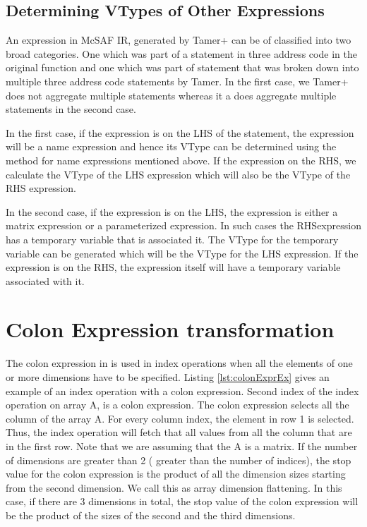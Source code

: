 \subsection{Determining VTypes of Other Expressions}
An expression in McSAF IR, generated by Tamer+ can be of classified into two broad categories. One which was part of a statement in three address code in the original \matlab function and one which was part of statement that was broken down into multiple three  address code statements by Tamer. In the first case, we Tamer+ does not aggregate multiple statements whereas it a does aggregate multiple statements in the second case.  

In the first case, if the expression is on the LHS of the statement, the expression will be a name expression and hence its VType can be determined using the method for name expressions mentioned above. If the expression on the RHS, we calculate the VType of the LHS expression which will also be the VType of the RHS expression. 

In the second case, if the expression is on the LHS, the expression is either a matrix expression or a parameterized expression. In such cases the RHSexpression has a temporary variable that is associated it. The VType for the temporary variable can be generated which will be the VType for the LHS expression. If the expression is on the RHS, the expression itself will have a temporary variable associated with it. 
\section{Colon Expression transformation}
\label{sec:colonExpr}
The colon expression in \matlab is used in index operations when all the elements of one or more dimensions have to be specified. Listing \ref{lst:colonExprEx} gives an example of an index operation with a colon expression. Second index of the index operation on array A, is a colon expression. The colon expression selects all the column of the array A. For every column index, the element in row 1 is selected. Thus, the index operation will fetch that all values from all the column that are in the first row. Note that we are assuming that the A is a matrix. If the number of dimensions are greater than 2 ( greater than the number of indices), the stop value for the colon expression is the product of all the dimension sizes starting from the second dimension. We call this as array dimension flattening. 
In this case, if there are 3 dimensions in total, the stop value of the colon expression will be the product of the sizes of the second and the third dimensions. 

